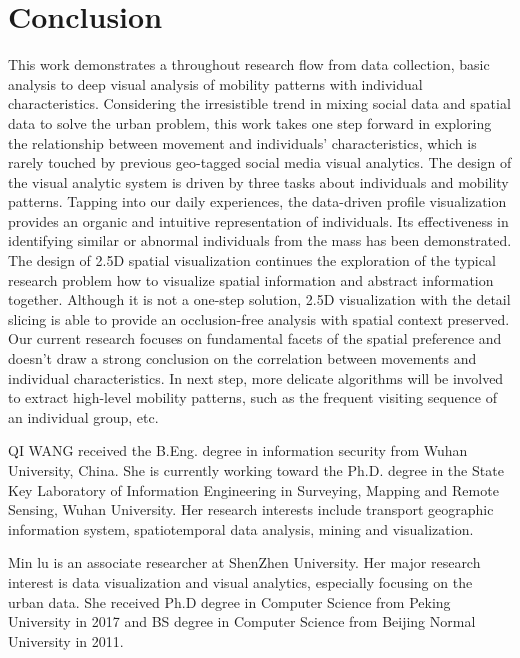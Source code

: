 \documentclass{ieeeaccess}
\begin{document}
\section{Conclusion}
\label{sec:conclusion}
This work demonstrates a throughout research flow from data collection, basic analysis to deep visual analysis of mobility patterns with individual characteristics. Considering the irresistible trend in mixing social data and spatial data to solve the urban problem, this work takes one step forward in exploring the relationship between movement and individuals’ characteristics, which is rarely touched by previous geo-tagged social media visual analytics. The design of the visual analytic system is driven by three tasks about individuals and mobility patterns. Tapping into our daily experiences, the data-driven profile visualization provides an organic and intuitive representation of individuals. Its effectiveness in identifying similar or abnormal individuals from the mass has been demonstrated. The design of 2.5D spatial visualization continues the exploration of the typical research problem how to visualize spatial information and abstract information together. Although it is not a one-step solution, 2.5D visualization with the detail slicing is able to provide an occlusion-free analysis with spatial context preserved.
Our current research focuses on fundamental facets of the spatial preference and doesn’t draw a strong conclusion on the correlation between movements and individual characteristics. In next step, more delicate algorithms will be involved to extract high-level mobility patterns, such as the frequent visiting sequence of an individual group, etc.




\begin{IEEEbiography}{QI WANG} received the B.Eng. degree in information security from Wuhan University, China. She is currently working toward the Ph.D. degree in the State Key Laboratory of Information Engineering in Surveying, Mapping and Remote Sensing, Wuhan University. Her research interests include transport geographic information system, spatiotemporal data analysis, mining and visualization.
\end{IEEEbiography}

\begin{IEEEbiography}{Min lu} is an associate researcher at ShenZhen University. Her major research interest is data visualization and visual analytics, especially focusing on the urban data. She received Ph.D degree in Computer Science from Peking University in 2017 and BS degree in Computer Science from Beijing Normal University in 2011.
\end{IEEEbiography}
\end{document}
